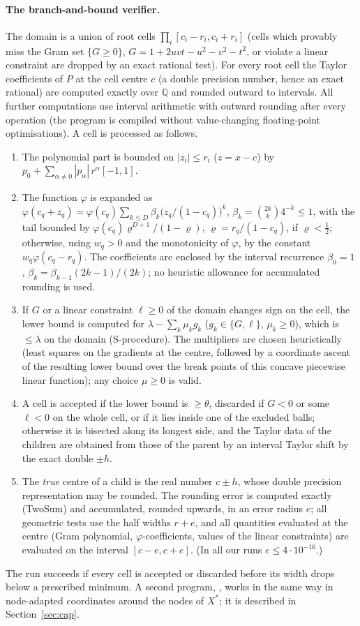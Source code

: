 \documentclass[11pt]{article}
\theoremstyle{definition}
\newcommand{\Q}{\mathbb{Q}}
\newcommand{\Xs}{X^{\ast}}
\begin{document}
\paragraph{The branch-and-bound verifier.}
The domain is a union of root cells $\prod_i[c_i-r_i,c_i+r_i]$ (cells which provably miss the Gram set
$\{G\ge0\}$, $G=1+2uvt-u^2-v^2-t^2$, or violate a linear constraint are dropped by an exact rational test).
For every root cell the Taylor coefficients of $P$ at the cell centre $c$ (a double precision number, hence an exact
rational) are computed exactly over $\Q$ and rounded outward to intervals.  All further computations use interval
arithmetic with outward rounding after every operation (the program is compiled without value-changing floating-point
optimisations).  A cell is processed as follows.
\begin{enumerate}[label=(\roman*)]
\item The polynomial part is bounded on $|z_i|\le r_i$ ($z=x-c$) by $p_0+\sum_{\alpha\ne0}|p_\alpha|\,r^\alpha[-1,1]$.
\item The function $\varphi$ is expanded as $\varphi(c_q+z_q)=\varphi(c_q)\sum_{k\le D}\beta_k\big(z_q/(1-c_q)\big)^k$,
$\beta_k=\binom{2k}{k}4^{-k}\le1$, with the tail bounded by $\varphi(c_q)\varrho^{D+1}/(1-\varrho)$, $\varrho=r_q/(1-c_q)$,
if $\varrho<\tfrac12$; otherwise, using $w_q>0$ and the monotonicity of $\varphi$, by the constant $w_q\varphi(c_q-r_q)$.
The coefficients are enclosed by the interval recurrence $\beta_0=1$,
$\beta_k=\beta_{k-1}(2k-1)/(2k)$; no heuristic allowance for accumulated rounding is used.
\item If $G$ or a linear constraint $\ell\ge0$ of the domain changes sign on the cell, the lower bound is computed for
$\lambda-\sum_k\mu_kg_k$ ($g_k\in\{G,\ell\}$, $\mu_k\ge0$), which is $\le\lambda$ on the domain (S-procedure). The
multipliers are chosen heuristically (least squares on the gradients at the centre, followed by a coordinate ascent of the
resulting lower bound over the break points of this concave piecewise linear function); any choice $\mu\ge0$ is valid.
\item A cell is accepted if the lower bound is $\ge\theta$, discarded if $G<0$ or some $\ell<0$ on the whole cell, or if it
lies inside one of the excluded balls; otherwise it is bisected along its longest side, and the Taylor data of the
children are obtained from those of the parent by an interval Taylor shift by the exact double $\pm h$.
\item The \emph{true} centre of a child is the real number $c\pm h$, whose double precision representation may be rounded.
The rounding error is computed exactly (TwoSum) and accumulated, rounded upwards, in an error radius $e$; all geometric tests
use the half widths $r+e$, and all quantities evaluated at the centre (Gram polynomial, $\varphi$-coefficients, values of
the linear constraints) are evaluated on the interval $[c-e,c+e]$. (In all our runs $e\le 4\cdot10^{-16}$.)
\end{enumerate}
The run succeeds if every cell is accepted or discarded before its width drops below a prescribed minimum.
A second program, , works in the same way in node-adapted coordinates around the nodes of $\Xs$; it is
described in Section~\ref{sec:cap}.
\end{document}
